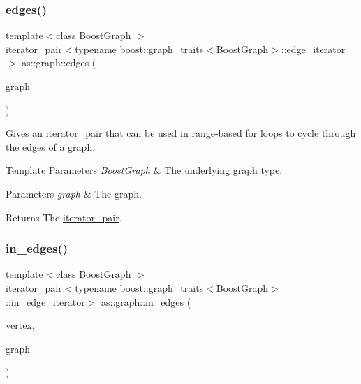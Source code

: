 \subsubsection{\texorpdfstring{edges()}{edges()}}
{\footnotesize\ttfamily template$<$class Boost\+Graph $>$ \\
\hyperlink{classas_1_1iterator__pair}{iterator\+\_\+pair}$<$typename boost\+::graph\+\_\+traits$<$Boost\+Graph$>$\+::edge\+\_\+iterator$>$ as\+::graph\+::edges (\begin{DoxyParamCaption}\item[{const Boost\+Graph \&}]{graph }\end{DoxyParamCaption})\hspace{0.3cm}{\ttfamily [inline]}}



Gives an \hyperlink{classas_1_1iterator__pair}{iterator\+\_\+pair} that can be used in range-\/based for loops to cycle through the edges of a graph. 


\begin{DoxyTemplParams}{Template Parameters}
{\em Boost\+Graph} & The underlying graph type. \\
\hline
\end{DoxyTemplParams}

\begin{DoxyParams}{Parameters}
{\em graph} & The graph. \\
\hline
\end{DoxyParams}
\begin{DoxyReturn}{Returns}
The \hyperlink{classas_1_1iterator__pair}{iterator\+\_\+pair}. 
\end{DoxyReturn}
\mbox{\label{namespaceas_1_1graph_ab75a465b1d5869f0ea8b698f02b067aa}} 
\subsubsection{\texorpdfstring{in\+\_\+edges()}{in\_edges()}}
{\footnotesize\ttfamily template$<$class Boost\+Graph $>$ \\
\hyperlink{classas_1_1iterator__pair}{iterator\+\_\+pair}$<$typename boost\+::graph\+\_\+traits$<$Boost\+Graph$>$\+::in\+\_\+edge\+\_\+iterator$>$ as\+::graph\+::in\+\_\+edges (\begin{DoxyParamCaption}\item[{const typename boost\+::graph\+\_\+traits$<$ Boost\+Graph $>$\+::vertex\+\_\+descriptor \&}]{vertex,  }\item[{const Boost\+Graph \&}]{graph }\end{DoxyParamCaption})\hspace{0.3cm}{\ttfamily [inline]}}



